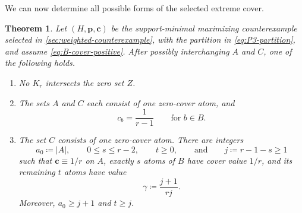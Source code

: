 \documentclass[10pt]{article}
\numberwithin{equation}{section}
\newtheorem{theorem}{Theorem}[section]
\newcommand{\vct}[1]{\boldsymbol{#1}}
\begin{document}
We can now determine all possible forms of the selected extreme cover.

\begin{theorem}\label{thm:rigid-cover}
Let $(H,\vct p,\vct c)$ be the support-minimal maximizing counterexample selected in \cref{sec:weighted-counterexample}, with the partition in \cref{eq:P3-partition}, and assume \cref{eq:B-cover-positive}.  After possibly interchanging $A$ and $C$, one of the following holds.
\begin{enumerate}[label=\textup{(\roman*)}]
\item No $K_r$ intersects the zero set $Z$.
\item The sets $A$ and $C$ each consist of one zero-cover atom, and
\[
 c_b=\frac1{r-1}\qquad\text{for }b\in B.
\]
\item The set $C$ consists of one zero-cover atom.  There are integers
\[
 a_0\coloneqq|A|,\qquad 0\le s\le r-2,\qquad t\ge0,
 \qquad\text{and}\qquad j\coloneqq r-1-s\ge1
\]
such that $\vct c\equiv1/r$ on $A$, exactly $s$ atoms of $B$ have cover value $1/r$, and its remaining $t$ atoms have value
\[
 \gamma\coloneqq\frac{j+1}{rj}.
\]
Moreover, $a_0\ge j+1$ and $t\ge j$.
\end{enumerate}
\end{theorem}
\end{document}
